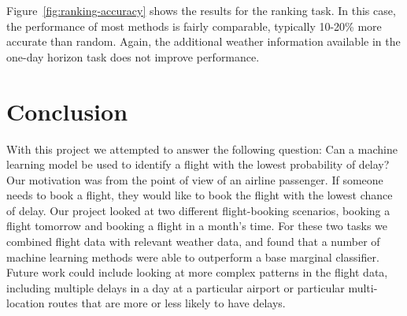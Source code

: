\documentclass[twocolumn]{article}
\begin{document}
Figure~\ref{fig:ranking-accuracy} shows the results for the ranking task. In this case, the performance of most methods is fairly comparable, typically 10-20\% more accurate than random. Again, the additional weather information available in the one-day horizon task does not improve performance.

\section{Conclusion}
With this project we attempted to answer the following question: Can a machine learning model be used to identify a flight with the lowest probability of delay? 
Our motivation was from the point of view of an airline passenger. 
If someone needs to book a flight, they would like to book the flight with the lowest chance of delay.
Our project looked at two different flight-booking scenarios, booking a flight tomorrow and booking a flight in a month's time.
For these two tasks we combined flight data with relevant weather data, and found that a number of machine learning methods were able to outperform a base marginal classifier.
Future work could include looking at more complex patterns in the flight data, including multiple delays in a day at a particular airport or particular multi-location routes that are more or less likely to have delays.





\end{document}
